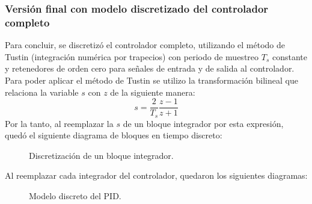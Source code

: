 \documentclass[a4paper, 10pt, onecolumn,journal]{ieeeconf}
\begin{document}
\subsubsection{\textbf{Versión final con modelo discretizado del controlador completo}} Para concluir, se discretizó el controlador completo, utilizando el método de Tustin (integración numérica por trapecios) con periodo de muestreo $T_s$ constante y retenedores de orden cero para señales de entrada y de salida al controlador.
Para poder aplicar el método de Tustin se utilizo la transformación bilineal que relaciona la variable $s$ con $z$ de la siguiente manera:
\begin{equation}
	s = \frac{2}{T_s} \frac{z-1}{z+1}
	\label{Transformación bilineal}
\end{equation}
Por la tanto, al reemplazar la $s$ de un bloque integrador por esta expresión, quedó el siguiente diagrama de bloques en tiempo discreto:
\begin{figure}[H]
	\centering
	\begin{adjustbox}{max width=\columnwidth}
	\end{adjustbox}
	\caption{Discretización de un bloque integrador.}
	\label{Discretización de un bloque integrador}
\end{figure}
Al reemplazar cada integrador del controlador, quedaron los siguientes diagramas:
\begin{figure}[H]
	\centering
	\begin{adjustbox}{max width=\columnwidth}
	\end{adjustbox}
	\caption{Modelo discreto del PID.}
	\label{Modelo discreto del PID}
\end{figure}
\end{document}
